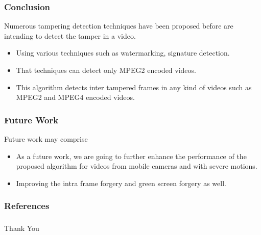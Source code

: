 \documentclass{beamer}
\begin{document}
\begin{frame}\frametitle{Conclusion}
\item Numerous tampering detection techniques have been proposed before are intending to detect the tamper in a video.
\begin{itemize}
    \item Using various techniques such as watermarking, signature detection.
    \item That techniques  can  detect  only  MPEG2  encoded  videos.
\end{itemize}
\begin{itemize}
\item This algorithm detects  inter tampered frames in any kind of videos such as MPEG2 and MPEG4 encoded videos.
\end{itemize}
\end{frame}
\begin{frame}\frametitle{Future Work}
Future work may comprise
\begin{itemize}
\item  As a future work, we are going to further enhance the performance of the proposed algorithm for videos from mobile cameras and with severe motions.
\item Improving the intra frame forgery and green screen forgery as well.
\end{itemize}
\end{frame}
\begin{frame}\frametitle{References}
\end{frame}

\begin{frame}\frametitle{}
\Huge
\begin{center}Thank You \end{center}
\end{frame}
\end{document}
